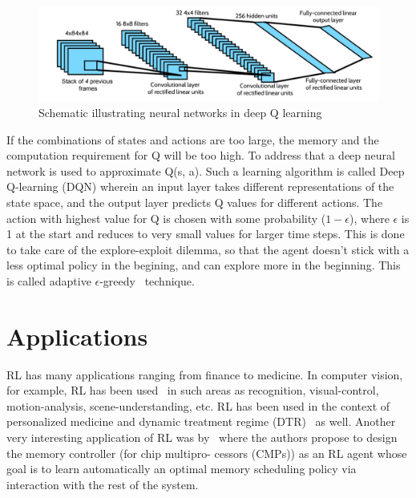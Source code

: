 \documentclass[aps, pre, reprint]{revtex4-1}
\begin{document}
\begin{figure}[ht!]
\includegraphics[scale=0.12]{q.png}
\caption{Schematic illustrating neural networks in deep Q learning}
\label{fig:off_control} 
\end{figure}

If the combinations of states and actions are too large, the memory and the computation requirement for Q will be too high. To address that a deep neural network is used to approximate Q(s, a). Such a learning algorithm is called Deep Q-learning (DQN) wherein an input layer takes different representations of the state space, and the output layer predicts Q values for different actions. The action with highest value for Q is chosen with some probability  ($1-\epsilon$), where $\epsilon$ is 1 at the start and reduces to very small values for larger time steps. This is done to take care of the explore-exploit dilemma, so that the agent doesn't stick with a less optimal policy in the begining, and can explore more in the beginning. This is called adaptive $\epsilon$-greedy~\cite{tokic2010adaptive} technique.

\section{Applications}
\label{sec:applications}
 RL has many applications ranging from finance to medicine. In computer vision, for example, RL has been used~\cite{mnih2015human, krull2017poseagent, yun2017action} in such areas as recognition, visual-control, motion-analysis, scene-understanding, etc. RL has been used in the context of personalized medicine and dynamic treatment regime (DTR)~\cite{murphy2003optimal} as well. Another very interesting application of RL was by~\citet{ipek2008self} where the authors propose to design the memory controller (for chip multipro-
cessors (CMPs)) as an RL agent whose goal is to learn automatically an optimal memory scheduling policy via interaction with the rest of the system. 
  
\end{document}
